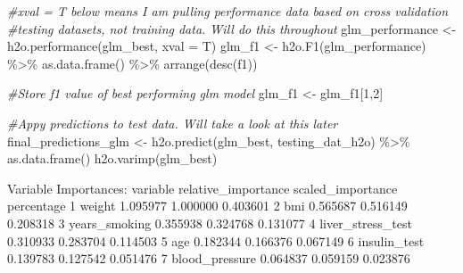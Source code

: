 \documentclass[
]{article}
\newenvironment{Shaded}{\begin{snugshade}}{\end{snugshade}}
\newcommand{\AttributeTok}[1]{\textcolor[rgb]{0.77,0.63,0.00}{#1}}
\newcommand{\CommentTok}[1]{\textcolor[rgb]{0.56,0.35,0.01}{\textit{#1}}}
\newcommand{\DecValTok}[1]{\textcolor[rgb]{0.00,0.00,0.81}{#1}}
\newcommand{\FunctionTok}[1]{\textcolor[rgb]{0.00,0.00,0.00}{#1}}
\newcommand{\NormalTok}[1]{#1}
\newcommand{\OtherTok}[1]{\textcolor[rgb]{0.56,0.35,0.01}{#1}}
\newcommand{\SpecialCharTok}[1]{\textcolor[rgb]{0.00,0.00,0.00}{#1}}
\begin{document}
\begin{Shaded}
\begin{Highlighting}[]
\CommentTok{\#xval = T below means I am pulling performance data based on cross validation}
\CommentTok{\#testing datasets, not training data. Will do this throughout}
\NormalTok{glm\_performance }\OtherTok{\textless{}{-}} \FunctionTok{h2o.performance}\NormalTok{(glm\_best, }\AttributeTok{xval =}\NormalTok{ T)}
\NormalTok{glm\_f1 }\OtherTok{\textless{}{-}} \FunctionTok{h2o.F1}\NormalTok{(glm\_performance) }\SpecialCharTok{\%\textgreater{}\%}
  \FunctionTok{as.data.frame}\NormalTok{() }\SpecialCharTok{\%\textgreater{}\%}
  \FunctionTok{arrange}\NormalTok{(}\FunctionTok{desc}\NormalTok{(f1)) }

\CommentTok{\#Store f1 value of best performing glm model}
\NormalTok{glm\_f1 }\OtherTok{\textless{}{-}}\NormalTok{ glm\_f1[}\DecValTok{1}\NormalTok{,}\DecValTok{2}\NormalTok{]}

\CommentTok{\#Appy predictions to test data. Will take a look at this later}
\NormalTok{final\_predictions\_glm }\OtherTok{\textless{}{-}} \FunctionTok{h2o.predict}\NormalTok{(glm\_best, testing\_dat\_h2o) }\SpecialCharTok{\%\textgreater{}\%}
  \FunctionTok{as.data.frame}\NormalTok{()}
\FunctionTok{h2o.varimp}\NormalTok{(glm\_best)}
\end{Highlighting}
\end{Shaded}

Variable Importances: variable relative\_importance scaled\_importance
percentage 1 weight 1.095977 1.000000 0.403601 2 bmi 0.565687 0.516149
0.208318 3 years\_smoking 0.355938 0.324768 0.131077 4
liver\_stress\_test 0.310933 0.283704 0.114503 5 age 0.182344 0.166376
0.067149 6 insulin\_test 0.139783 0.127542 0.051476 7 blood\_pressure
0.064837 0.059159 0.023876
\end{document}
